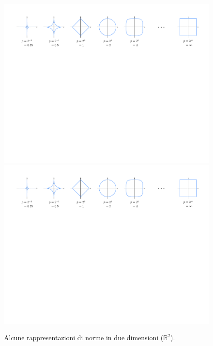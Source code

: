 \documentclass[a4paper]{article}
\begin{document}
	\begin{figure}[!htp]
		\centering
		\includegraphics[width=.8\textwidth]{img/rappresentazione_n=2_1.pdf}
		\includegraphics[width=.9\textwidth]{img/rappresentazione_n=2_2.pdf}
		\caption{Alcune rappresentazioni di norme in due dimensioni ($\mathbb{R}^{2}$).}
		\label{fig: alcune rappresentazioni di norme in due dimensioni}
	\end{figure}
\end{document}
